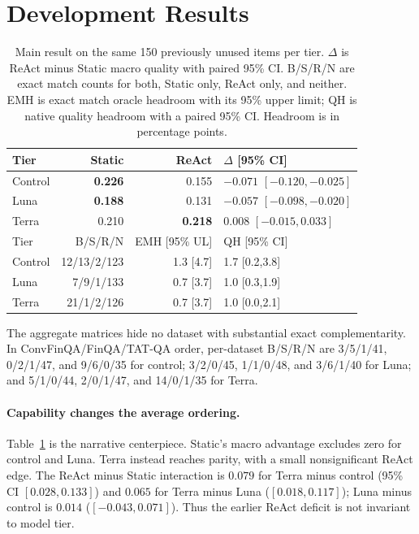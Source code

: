 \section{Development Results}
\label{sec:results}

\begin{table}[t]
  \caption{Main result on the same 150 previously unused items per tier. $\Delta$ is
  ReAct minus Static macro quality with paired 95\% CI. B/S/R/N are exact match
  counts for both, Static only, ReAct only, and neither. EMH is exact match oracle
  headroom with its 95\% upper limit; QH is native quality headroom with a
  paired 95\% CI. Headroom is in percentage points.}
  \label{tab:capabilityresult}
  \centering
  \scriptsize
  \setlength{\tabcolsep}{3.0pt}
  \begin{tabular}{@{}lrrl@{}}
    \toprule
    Tier & Static & ReAct & $\Delta$ [95\% CI] \\
    \midrule
    Control & \textbf{0.226} & 0.155 & $-0.071$ $[-0.120,-0.025]$ \\
    Luna & \textbf{0.188} & 0.131 & $-0.057$ $[-0.098,-0.020]$ \\
    Terra & 0.210 & \textbf{0.218} & $0.008$ $[-0.015,0.033]$ \\
    \midrule
    Tier & B/S/R/N & EMH [95\% UL] & QH [95\% CI] \\
    Control & 12/13/2/123 & 1.3 [4.7] & 1.7 [0.2,3.8] \\
    Luna & 7/9/1/133 & 0.7 [3.7] & 1.0 [0.3,1.9] \\
    Terra & 21/1/2/126 & 0.7 [3.7] & 1.0 [0.0,2.1] \\
    \bottomrule
  \end{tabular}
\end{table}

The aggregate matrices hide no dataset with substantial exact complementarity.
In ConvFinQA/FinQA/TAT-QA order, per-dataset B/S/R/N are
3/5/1/41, 0/2/1/47, and 9/6/0/35 for control;
3/2/0/45, 1/1/0/48, and 3/6/1/40 for Luna; and
5/1/0/44, 2/0/1/47, and 14/0/1/35 for Terra.

\paragraph{Capability changes the average ordering.}
Table~\ref{tab:capabilityresult} is the narrative centerpiece. Static's macro
advantage excludes zero for control and Luna. Terra instead reaches parity,
with a small nonsignificant ReAct edge. The ReAct minus Static interaction is
$0.079$ for Terra minus control (95\% CI $[0.028,0.133]$) and $0.065$ for Terra
minus Luna ($[0.018,0.117]$); Luna minus control is $0.014$
($[-0.043,0.071]$). Thus the earlier ReAct deficit is not invariant to model
tier.

